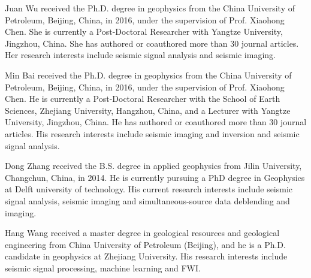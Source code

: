 %
%
\clearpage
\begin{IEEEbiography}{Juan Wu} received the Ph.D. degree in geophysics from the China University of Petroleum, Beijing, China, in 2016, under the supervision of Prof. Xiaohong Chen.
She is currently a Post-Doctoral Researcher with Yangtze University, Jingzhou, China. She has authored or coauthored more than 30 journal articles. Her research interests include seismic signal analysis and seismic imaging.
\end{IEEEbiography}

\begin{IEEEbiography}{Min Bai}
 received the Ph.D. degree in geophysics from the China University of Petroleum, Beijing, China, in 2016, under the supervision of Prof. Xiaohong Chen.
He is currently a Post-Doctoral Researcher with the School of Earth Sciences, Zhejiang University, Hangzhou, China, and a Lecturer with Yangtze University, Jingzhou, China. He has authored or coauthored more than 30 journal articles. His research interests include seismic imaging and inversion and seismic signal analysis.
\end{IEEEbiography}




\begin{IEEEbiography}{Dong Zhang} received the B.S. degree in applied geophysics from Jilin University, Changchun, China, in 2014.  He is currently pursuing a PhD degree in Geophysics at Delft university of technology. His current research interests include seismic signal analysis, seismic imaging and simultaneous-source data deblending and imaging.
\end{IEEEbiography}

\begin{IEEEbiography}{Hang Wang} received a master degree in geological resources and geological engineering from China University of Petroleum (Beijing), and he is a Ph.D. candidate in geophysics at Zhejiang University. His research interests include seismic signal processing, machine learning and FWI.
\end{IEEEbiography}



